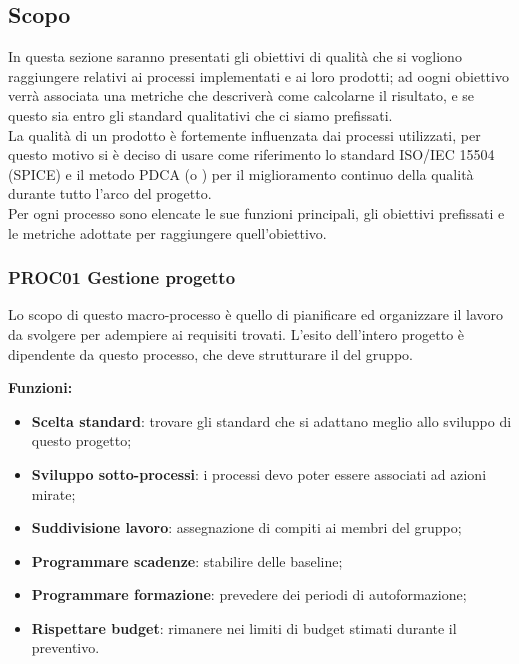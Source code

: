 \documentclass[../piano_di_qualifica.tex]{subfiles}
\begin{document}
\subsection{Scopo}
In questa sezione saranno presentati gli obiettivi di qualità che si vogliono raggiungere relativi ai processi implementati e ai loro prodotti; ad oogni obiettivo verrà associata una metriche che descriverà come calcolarne il risultato, e se questo sia entro gli standard qualitativi che ci siamo prefissati.\\
La qualità di un prodotto è fortemente influenzata dai processi utilizzati, per questo motivo si è deciso di usare come riferimento lo standard ISO/IEC 15504 (SPICE)  e il metodo PDCA (o ) per il miglioramento continuo della qualità durante tutto l'arco del progetto.\\
Per ogni processo sono elencate le sue funzioni principali, gli obiettivi prefissati e le metriche adottate per raggiungere quell’obiettivo.

\subsubsection{PROC01 Gestione progetto}
Lo scopo di questo macro-processo è quello di pianificare ed organizzare il lavoro da svolgere per adempiere ai requisiti trovati. L'esito dell'intero progetto è dipendente da questo processo, che deve strutturare il  del gruppo.

\setlength{\parindent}{0pt}\textbf{Funzioni:}
\smallbreak
\begin{itemize}
	\item \textbf{Scelta standard}: trovare gli standard che si adattano meglio allo sviluppo di questo progetto;
	\item \textbf{Sviluppo sotto-processi}: i processi devo poter essere associati ad azioni mirate;
	\item \textbf{Suddivisione lavoro}: assegnazione di compiti ai membri del gruppo;
	\item \textbf{Programmare scadenze}: stabilire delle baseline;
	\item \textbf{Programmare formazione}: prevedere dei periodi di autoformazione;
	\item \textbf{Rispettare budget}: rimanere nei limiti di budget stimati durante il preventivo.
\end{itemize}
\end{document}
